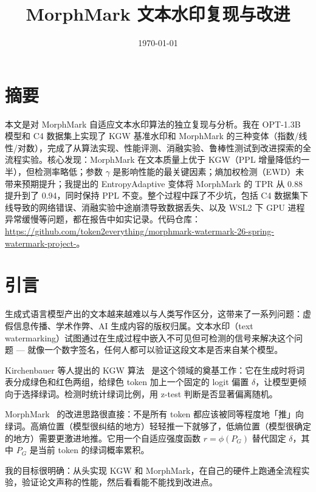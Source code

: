 \documentclass[11pt,a4paper]{article}
\title{\textbf{MorphMark 文本水印复现与改进}}
\author{}
\date{\today}
\begin{document}
\maketitle

\section{摘要}

本文是对 MorphMark 自适应文本水印算法的独立复现与分析。我在 OPT-1.3B 模型和 C4 数据集上实现了 KGW 基准水印和 MorphMark 的三种变体（指数/线性/对数），完成了从算法实现、性能评测、消融实验、鲁棒性测试到改进探索的全流程实验。核心发现：MorphMark 在文本质量上优于 KGW（PPL 增量降低约一半），但检测率略低；参数 $\gamma$ 是影响性能的最关键因素；熵加权检测（EWD）未带来预期提升；我提出的 EntropyAdaptive 变体将 MorphMark 的 TPR 从 0.88 提升到了 0.94，同时保持 PPL 不变。整个过程中踩了不少坑，包括 C4 数据集下线导致的网络错误、消融实验中途崩溃导致数据丢失、以及 WSL2 下 GPU 进程异常缓慢等问题，都在报告中如实记录。代码仓库：\url{https://github.com/token2everything/morphmark-watermark-26-spring-watermark-project-}。

\section{引言}

生成式语言模型产出的文本越来越难以与人类写作区分，这带来了一系列问题：虚假信息传播、学术作弊、AI 生成内容的版权归属。文本水印（text watermarking）试图通过在生成过程中嵌入不可见但可检测的信号来解决这个问题 — 就像一个数字签名，任何人都可以验证这段文本是否来自某个模型。

Kirchenbauer 等人提出的 KGW 算法~\cite{kgw2023} 是这个领域的奠基工作：它在生成时将词表分成绿色和红色两组，给绿色 token 加上一个固定的 logit 偏置 $\delta$，让模型更倾向于选择绿词。检测时统计绿词比例，用 z-test 判断是否显著偏离随机。

MorphMark~\cite{morphmark} 的改进思路很直接：不是所有 token 都应该被同等程度地「推」向绿词。高熵位置（模型很纠结的地方）轻轻推一下就够了，低熵位置（模型很确定的地方）需要更激进地推。它用一个自适应强度函数 $r = \phi(P_G)$ 替代固定 $\delta$，其中 $P_G$ 是当前 token 的绿词概率累积。

我的目标很明确：从头实现 KGW 和 MorphMark，在自己的硬件上跑通全流程实验，验证论文声称的性能，然后看看能不能找到改进点。
\end{document}
